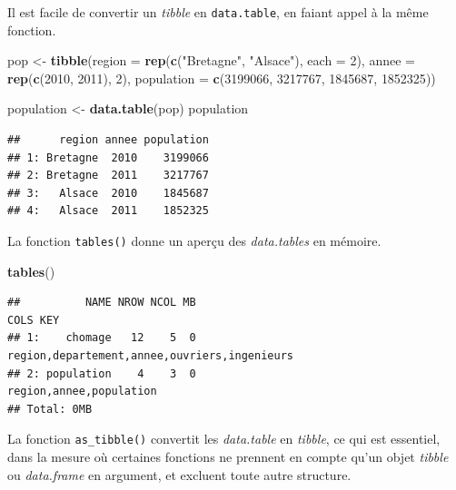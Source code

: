 \documentclass[
  11pt,
]{book}
\newenvironment{Shaded}{\begin{snugshade}}{\end{snugshade}}
\newcommand{\DataTypeTok}[1]{\textcolor[rgb]{0.13,0.29,0.53}{#1}}
\newcommand{\DecValTok}[1]{\textcolor[rgb]{0.00,0.00,0.81}{#1}}
\newcommand{\KeywordTok}[1]{\textcolor[rgb]{0.13,0.29,0.53}{\textbf{#1}}}
\newcommand{\NormalTok}[1]{#1}
\newcommand{\StringTok}[1]{\textcolor[rgb]{0.31,0.60,0.02}{#1}}
\numberwithin{equation}{section}
\numberwithin{countremarque}{section}
\begin{document}
Il est facile de convertir un \emph{tibble} en \texttt{data.table}, en faiant appel à la même fonction.

\begin{Shaded}
\begin{Highlighting}[]
\NormalTok{pop \textless{}{-}}\StringTok{ }
\StringTok{  }\KeywordTok{tibble}\NormalTok{(}\DataTypeTok{region =} \KeywordTok{rep}\NormalTok{(}\KeywordTok{c}\NormalTok{(}\StringTok{"Bretagne"}\NormalTok{, }\StringTok{"Alsace"}\NormalTok{), }\DataTypeTok{each =} \DecValTok{2}\NormalTok{),}
             \DataTypeTok{annee =} \KeywordTok{rep}\NormalTok{(}\KeywordTok{c}\NormalTok{(}\DecValTok{2010}\NormalTok{, }\DecValTok{2011}\NormalTok{), }\DecValTok{2}\NormalTok{),}
             \DataTypeTok{population =} \KeywordTok{c}\NormalTok{(}\DecValTok{3199066}\NormalTok{, }\DecValTok{3217767}\NormalTok{, }\DecValTok{1845687}\NormalTok{, }\DecValTok{1852325}\NormalTok{))}

\NormalTok{population \textless{}{-}}\StringTok{ }\KeywordTok{data.table}\NormalTok{(pop)}
\NormalTok{population}
\end{Highlighting}
\end{Shaded}

\begin{lstlisting}
##      region annee population
## 1: Bretagne  2010    3199066
## 2: Bretagne  2011    3217767
## 3:   Alsace  2010    1845687
## 4:   Alsace  2011    1852325
\end{lstlisting}

La fonction \texttt{tables()} donne un aperçu des \emph{data.tables} en mémoire.

\begin{Shaded}
\begin{Highlighting}[]
\KeywordTok{tables}\NormalTok{()}
\end{Highlighting}
\end{Shaded}

\begin{lstlisting}
##          NAME NROW NCOL MB                                         COLS KEY
## 1:    chomage   12    5  0 region,departement,annee,ouvriers,ingenieurs    
## 2: population    4    3  0                      region,annee,population    
## Total: 0MB
\end{lstlisting}

La fonction \texttt{as\_tibble()} convertit les \emph{data.table} en \emph{tibble}, ce qui est essentiel, dans la mesure où certaines fonctions ne prennent en compte qu'un objet \emph{tibble} ou \emph{data.frame} en argument, et excluent toute autre structure.
\end{document}
